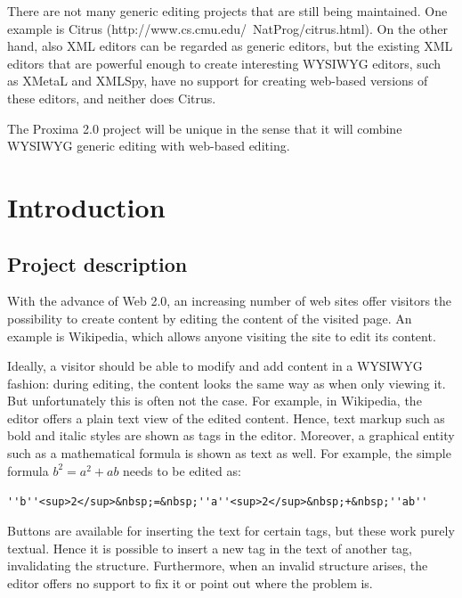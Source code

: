 \documentclass[10pt]{article}
\begin{document}
There are not many generic editing projects that are still being maintained. One example is Citrus (http://www.cs.cmu.edu/~NatProg/citrus.html). On the other hand, also XML editors can be regarded as generic editors, but the existing XML editors that are powerful enough to create interesting WYSIWYG editors, such as XMetaL and XMLSpy, have no support for creating web-based versions of these editors, and neither does Citrus.

The Proxima 2.0 project will be unique in the sense that it will combine WYSIWYG generic editing with web-based editing.

\section{Introduction}

\subsection{Project description}

With the advance of Web 2.0, an increasing number of web sites offer visitors the possibility to create content by editing the content of the visited page. An example is Wikipedia, which allows anyone visiting the site to edit its content.

Ideally, a visitor should be able to modify and add content in a WYSIWYG fashion:  during editing, the content looks the same way as when only viewing it. But unfortunately this is often not the case. For example, in Wikipedia, the editor offers a plain text view of the edited content. Hence, text markup such as bold and italic styles are shown as tags in the editor. Moreover, a graphical entity such as a mathematical formula is shown as text as well. For example, the simple formula $b^2 = a^2 + ab$ needs to be edited as:
 
\begin{center}
\verb|''b''<sup>2</sup>&nbsp;=&nbsp;''a''<sup>2</sup>&nbsp;+&nbsp;''ab''|
\end{center}

Buttons are available for inserting the text for certain tags, but these work purely textual. Hence it is possible to insert a new tag in the text of another tag, invalidating the structure. Furthermore, when an invalid structure arises, the editor offers no support to fix it or point out where the problem is. 
\end{document}
